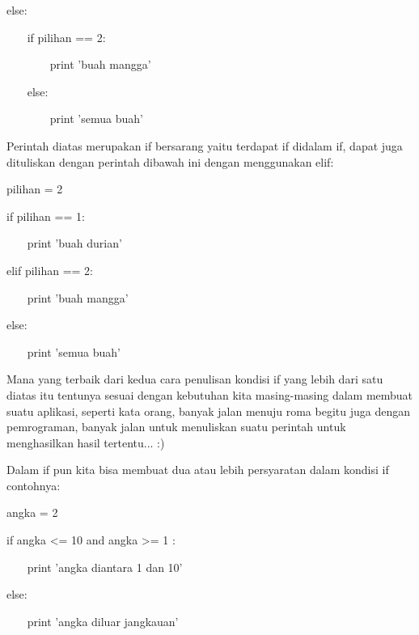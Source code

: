 \vspace{12pt}
\noindent 
else: \par
\vspace{12pt}
\noindent 
~~~ if pilihan == 2: \par
\vspace{12pt}
\noindent 
~~~~~~~ print 'buah mangga' \par
\vspace{12pt}
\noindent 
~~~ else: \par
\vspace{12pt}
\noindent 
~~~~~~~ print 'semua buah' \par
\vspace{12pt}
\noindent 
Perintah diatas merupakan if bersarang yaitu terdapat if didalam if, dapat juga dituliskan dengan perintah dibawah ini dengan menggunakan $  $elif: \par
\vspace{12pt}
\noindent 
pilihan = 2 \par
\vspace{12pt}
\noindent 
if pilihan == 1: \par
\vspace{12pt}
\noindent 
~~~ print 'buah durian' \par
\vspace{12pt}
\noindent 
elif pilihan == 2: \par
\vspace{12pt}
\noindent 
~~~ print 'buah mangga' \par
\vspace{12pt}
\noindent 
else: \par
\vspace{12pt}
\noindent 
~~~ print 'semua buah' \par
\vspace{12pt}
\noindent 
Mana yang terbaik dari kedua cara penulisan kondisi if yang lebih dari satu diatas itu tentunya sesuai dengan kebutuhan kita masing-masing dalam membuat suatu aplikasi, seperti kata orang, banyak jalan menuju roma begitu juga dengan pemrograman, banyak jalan untuk menuliskan suatu perintah untuk menghasilkan hasil tertentu... :) \par
\vspace{12pt}
\noindent 
Dalam if pun kita bisa membuat dua atau lebih persyaratan dalam kondisi $  $if $  $contohnya: \par
\vspace{12pt}
\noindent 
angka = 2 \par
\vspace{12pt}
\noindent 
if angka <= 10 and angka >= 1 : \par
\vspace{12pt}
\noindent 
~~~ print 'angka diantara 1 dan 10' \par
\vspace{12pt}
\noindent 
else: \par
\vspace{12pt}
\noindent 
~~~ print 'angka diluar jangkauan' \par
\vspace{12pt}
\vspace{12pt}

